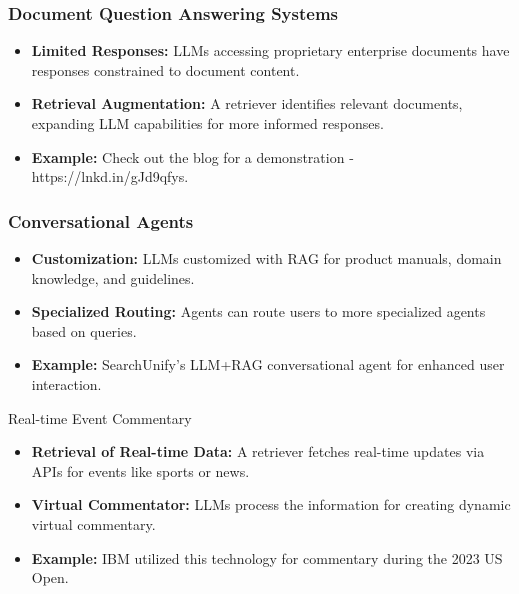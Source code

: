 \begin{frame}[fragile]\frametitle{Document Question Answering Systems}

\begin{itemize}
  \item \textbf{Limited Responses:} LLMs accessing proprietary enterprise documents have responses constrained to document content.
  
  \item \textbf{Retrieval Augmentation:} A retriever identifies relevant documents, expanding LLM capabilities for more informed responses.
  
  \item \textbf{Example:} Check out the blog for a demonstration - https://lnkd.in/gJd9qfys.
\end{itemize}

\end{frame}

\begin{frame}[fragile]\frametitle{Conversational Agents}

\begin{itemize}
  \item \textbf{Customization:} LLMs customized with RAG for product manuals, domain knowledge, and guidelines.
  
  \item \textbf{Specialized Routing:} Agents can route users to more specialized agents based on queries.
  
  \item \textbf{Example:} SearchUnify's LLM+RAG conversational agent for enhanced user interaction.
\end{itemize}

\end{frame}

\begin{frame}[fragile]{Real-time Event Commentary}

\begin{itemize}
  \item \textbf{Retrieval of Real-time Data:} A retriever fetches real-time updates via APIs for events like sports or news.
  
  \item \textbf{Virtual Commentator:} LLMs process the information for creating dynamic virtual commentary.
  
  \item \textbf{Example:} IBM utilized this technology for commentary during the 2023 US Open.
\end{itemize}

\end{frame}

